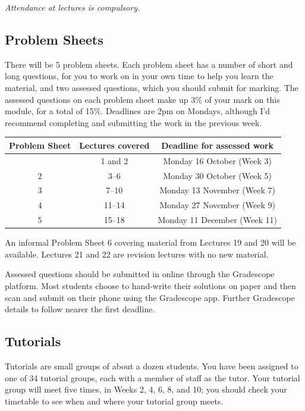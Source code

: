 \documentclass[
  a4paper,
]{book}
\theoremstyle{definition}
\theoremstyle{definition}
\theoremstyle{definition}
\theoremstyle{definition}
\theoremstyle{remark}
\begin{document}
\emph{Attendance at lectures is compulsory.}

\hypertarget{problem-sheets}{%
\subsection*{Problem Sheets}\label{problem-sheets}}

There will be 5 problem sheets. Each problem sheet has a number of short and long questions, for you to work on in your own time to help you learn the material, and two assessed questions, which you should submit for marking. The assessed questions on each problem sheet make up 3\% of your mark on this module, for a total of 15\%. Deadlines are 2pm on Mondays, although I'd recommend completing and submitting the work in the previous week.

\begin{longtable}[]{@{}ccc@{}}
\toprule\noalign{}
Problem Sheet & Lectures covered & Deadline for assessed work \\
\midrule\noalign{}
\endhead
\bottomrule\noalign{}
\endlastfoot
1 & 1 and 2 & Monday 16 October (Week 3) \\
2 & 3--6 & Monday 30 October (Week 5) \\
3 & 7--10 & Monday 13 November (Week 7) \\
4 & 11--14 & Monday 27 November (Week 9) \\
5 & 15--18 & Monday 11 December (Week 11) \\
\end{longtable}

An informal Problem Sheet 6 covering material from Lectures 19 and 20 will be available. Lectures 21 and 22 are revision lectures with no new material.

Assessed questions should be submitted in online through the Gradescope platform. Most students choose to hand-write their solutions on paper and then scan and submit on their phone using the Gradescope app. Further Gradescope details to follow nearer the first deadline.

\hypertarget{tutorials}{%
\subsection*{Tutorials}\label{tutorials}}

Tutorials are small groups of about a dozen students. You have been assigned to one of 34 tutorial groups, each with a member of staff as the tutor. Your tutorial group will meet five times, in Weeks 2, 4, 6, 8, and 10; you should check your timetable to see when and where your tutorial group meets.
\end{document}
